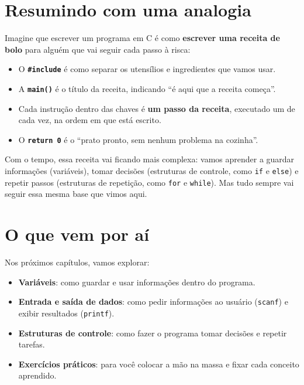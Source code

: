 \section{\textcolor{azulPrincipal}{Resumindo com uma analogia}}

\begin{dica}[Analogia]
Imagine que escrever um programa em C é como \textbf{escrever uma receita de bolo} para alguém que vai seguir cada passo à risca:

\begin{itemize}
    \item O \textbf{\texttt{\#include}} é como separar os utensílios e ingredientes que vamos usar.
    \item A \textbf{\texttt{main()}} é o título da receita, indicando ``é aqui que a receita começa''.
    \item Cada instrução dentro das chaves é \textbf{um passo da receita}, executado um de cada vez, na ordem em que está escrito.
    \item O \textbf{\texttt{return 0}} é o ``prato pronto, sem nenhum problema na cozinha''.
\end{itemize}
\end{dica}

Com o tempo, essa receita vai ficando mais complexa: vamos aprender a guardar informações (variáveis), tomar decisões (estruturas de controle, como \texttt{if} e \texttt{else}) e repetir passos (estruturas de repetição, como \texttt{for} e \texttt{while}). Mas tudo sempre vai seguir essa mesma base que vimos aqui.

\section{\textcolor{azulPrincipal}{O que vem por aí}}

Nos próximos capítulos, vamos explorar:

\begin{itemize}
    \item \textbf{\textcolor{laranja}{Variáveis}}: como guardar e usar informações dentro do programa.
    \item \textbf{\textcolor{laranja}{Entrada e saída de dados}}: como pedir informações ao usuário (\texttt{scanf}) e exibir resultados (\texttt{printf}).
    \item \textbf{\textcolor{laranja}{Estruturas de controle}}: como fazer o programa tomar decisões e repetir tarefas.
    \item \textbf{\textcolor{laranja}{Exercícios práticos}}: para você colocar a mão na massa e fixar cada conceito aprendido.
\end{itemize}

